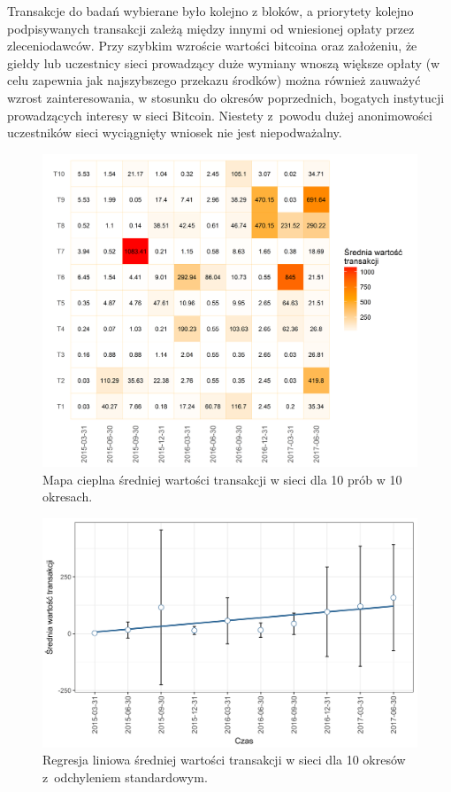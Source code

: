\documentclass[12pt, twoside, final, openany]{mgr}
\newcommand{\chartsWidth}{0.8}
\begin{document}
\indent Transakcje do badań wybierane było kolejno z bloków, a priorytety kolejno podpisywanych transakcji zależą między innymi od wniesionej opłaty przez zleceniodawców. Przy szybkim wzroście wartości bitcoina oraz założeniu, że giełdy lub uczestnicy sieci prowadzący duże wymiany wnoszą większe opłaty (w celu zapewnia jak najszybszego przekazu środków) można również zauważyć wzrost zainteresowania, w stosunku do okresów poprzednich, bogatych instytucji prowadzących interesy w sieci Bitcoin. Niestety z~powodu dużej anonimowości uczestników sieci wyciągnięty wniosek nie jest niepodważalny.

\begin{figure}[H]
\centering
   \includegraphics[width=\chartsWidth\linewidth]{pictures/wartosc_transakcji/wartosc_transakcji_hm.png}
   \caption{Mapa cieplna średniej wartości transakcji w sieci dla 10 prób w 10 okresach.}
   \label{fig:wt1} 
\end{figure}
\begin{figure}[H]
\centering
   \includegraphics[width=\chartsWidth\linewidth]{pictures/wartosc_transakcji/wartosc_transakcji_sda.png}
   \caption{Regresja liniowa średniej wartości transakcji w sieci dla 10 okresów z~odchyleniem standardowym.}
   \label{fig:wt2}
\end{figure}
\end{document}
